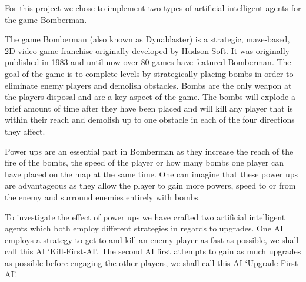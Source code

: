 % 
For this project we chose to implement two types of artificial intelligent agents for the game Bomberman.

The game Bomberman (also known as Dynablaster) is a strategic, maze-based, 2D
video game franchise originally developed by Hudson Soft. It was originally
published in 1983 and until now over 80 games have featured
Bomberman\cite{bomberman2013}.
The goal of the game is to complete levels by strategically placing bombs in order to eliminate enemy players and demolish obstacles. 
Bombs are the only weapon at the players disposal and are a key aspect of the
game. The bombs will explode a brief amount of time after they have been placed
and will kill any player that is within their reach and demolish up to one
obstacle in each of the four directions they affect. 

Power ups are an essential part in Bomberman as they increase the reach of the
fire of the bombs, the speed of the player or how many bombs one player can have
placed on the map at the same time. One can imagine that these power ups are
advantageous as they allow the player to gain more powers, speed to or from the enemy and surround enemies entirely with bombs.

To investigate the effect of power ups we have crafted two artificial intelligent agents which both employ different strategies in regards to upgrades. One AI employs a strategy to get to and kill an enemy player as fast as possible, we shall call this AI `Kill-First-AI'. The second AI first attempts to gain as much upgrades as possible before engaging the other players, we shall call this AI `Upgrade-First-AI'.
